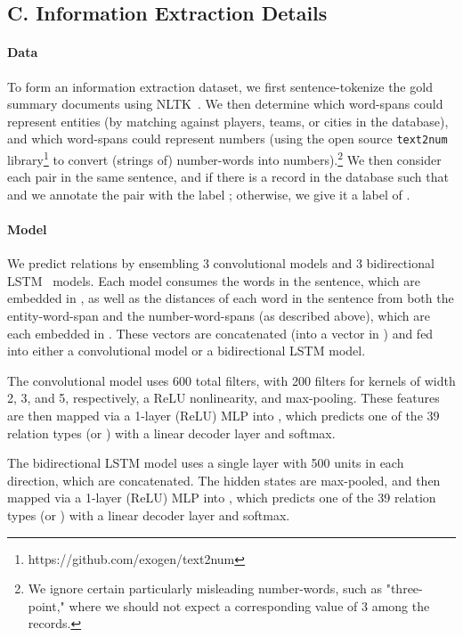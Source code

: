 \documentclass[11pt,letterpaper]{article}
\begin{document}
\subsection*{C. Information Extraction Details}
\paragraph{Data} To form an information extraction dataset, we first sentence-tokenize the gold summary documents  using NLTK~\cite{bird2006nltk}. We then determine which word-spans  could represent entities (by matching against players, teams, or cities in the database), and which word-spans  could represent numbers (using the open source \texttt{text2num} library\footnote{https://github.com/exogen/text2num} to convert (strings of) number-words into numbers).\footnote{We ignore certain particularly misleading number-words, such as "three-point," where we should not expect a corresponding value of 3 among the records.} We then consider each  pair in the same sentence, and if there is a record  in the database such that  and  we annotate the  pair with the label ; otherwise, we give it a label of .

\paragraph{Model}
We predict relations by ensembling 3 convolutional models and 3 bidirectional LSTM~\cite{hochreiter1997lstm,graves2005framewise} models. 
Each model consumes the words in the sentence, which are embedded in , as well as the distances of each word in the sentence from both the entity-word-span and the number-word-spans (as described above), which are each embedded in . These vectors are concatenated (into a vector in ) and fed into either a convolutional model or a bidirectional LSTM model. 

The convolutional model uses 600 total filters, with 200 filters for kernels of width 2, 3, and 5, respectively, a ReLU nonlinearity, and max-pooling. These features are then mapped via a 1-layer (ReLU) MLP into , which predicts one of the 39 relation types (or ) with a linear decoder layer and softmax. 

The bidirectional LSTM model uses a single layer with 500 units in each direction, which are concatenated. The hidden states are max-pooled, and then mapped via a 1-layer (ReLU) MLP into , which predicts one of the 39 relation types (or ) with a linear decoder layer and softmax.
\end{document}
